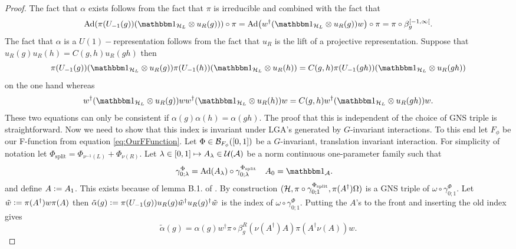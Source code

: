\documentclass[11pt,a4paper,twoside]{article}
\numberwithin{equation}{section}
\begin{document}
	\begin{proof}
		The fact that $\alpha$ exists follows from the fact that $\pi$ is irreducible and combined with the fact that
		\begin{equation}
			\Ad{\pi(U_{-1}(g)) (\id_{\HH_L}\otimes u_R(g))}\circ\pi=\Ad{w^\dagger(\id_{\HH_L}\otimes u_R(g)) w}\circ\pi=\pi\circ\beta_g^{[-1,\infty[}.
		\end{equation}
		The fact that $\alpha$ is a $U(1)-$representation follows from the fact that $u_R$ is the lift of a projective representation. Suppose that $u_R(g)u_R(h)=C(g,h)u_R(gh)$ then
		\begin{equation}
			\pi(U_{-1}(g)) (\id_{\HH_L}\otimes u_R(g))\pi(U_{-1}(h)) (\id_{\HH_L}\otimes u_R(h))=C(g,h)\pi(U_{-1}(gh)) (\id_{\HH_L}\otimes u_R(gh))
		\end{equation}
		on the one hand whereas
		\begin{equation}
			w^\dagger(\id_{\HH_L}\otimes u_R(g)) ww^\dagger(\id_{\HH_L}\otimes u_R(h)) w=C(g,h)w^\dagger(\id_{\HH_L}\otimes u_R(gh)) w.
		\end{equation}
		These two equations can only be consistent if $\alpha(g)\alpha(h)=\alpha(gh)$. The proof that this is independent of the choice of GNS triple is straightforward. Now we need to show that this index is invariant under LGA's generated by $G$-invariant interactions. To this end let $F_\phi$ be our F-function from equation \eqref{eq:OurFFunction}. Let $\Phi\in\mathcal B_{F_\phi}([0,1])$ be a $G$-invariant, translation invariant interaction. For simplicity of notation let $\Phi_{\text{split}}=\Phi_{\nu^{-1}(L)}+\Phi_{\nu(R)}$. Let $\lambda\in[0,1]\mapsto A_\lambda\in\mathcal U(\mathcal A)$ be a norm continuous one-parameter family such that
		\begin{align}\label{eq:DefinitionSplitting1DAppendix}
			\gamma^\Phi_{0;\lambda}&=\Ad{A_\lambda}\circ\gamma^{\Phi_{\text{split}}}_{0;\lambda}&A_0&=\id_\AA.
		\end{align}
		and define $A\vcentcolon= A_1$. This exists because of lemma B.1. of \cite{jappens2023spt}. By construction $(\mathcal H,\pi\circ\gamma^{\Phi_{\text{split}}}_{0;1},\pi(A^\dagger)\Omega)$ is a GNS triple of $\omega\circ\gamma^\Phi_{0;1}$. Let $\tilde{w}\vcentcolon= \pi(A^\dagger)w\pi(A)$ then $\tilde{\alpha}(g)\vcentcolon= \pi(U_{-1}(g))u_R(g)\tilde{w}^\dagger u_R(g)^\dagger \tilde{w}$ is the index of $\omega\circ\gamma^\Phi_{0;1}$. Putting the $A$'s to the front and inserting the old index gives
		\begin{equation}
			\tilde{\alpha}(g)=\alpha(g)w^\dagger \pi\circ\beta_g^R(\nu(A^\dagger)A)\pi(A^\dagger\nu(A))w.

\end{equation}
\end{proof}
\end{document}
